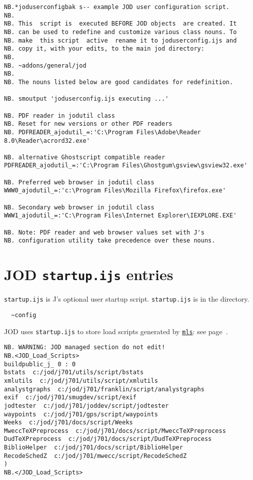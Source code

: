 \begin{lstlisting}[frame=single,framerule=0pt,basicstyle=\ttfamily\footnotesize]  
NB.*joduserconfigbak s-- example JOD user configuration script.
NB.
NB. This  script is  executed BEFORE JOD objects  are created. It
NB. can be used to redefine and customize various class nouns. To
NB. make  this script  active  rename it to joduserconfig.ijs and
NB. copy it, with your edits, to the main jod directory:
NB.
NB. ~addons/general/jod
NB.
NB. The nouns listed below are good candidates for redefinition.

NB. smoutput 'joduserconfig.ijs executing ...'

NB. PDF reader in jodutil class
NB. Reset for new versions or other PDF readers
NB. PDFREADER_ajodutil_=:'C:\Program Files\Adobe\Reader 8.0\Reader\acrord32.exe'

NB. alternative Ghostscript compatible reader
PDFREADER_ajodutil_=:'C:\Program Files\Ghostgum\gsview\gsview32.exe'

NB. Preferred web browser in jodutil class
WWW0_ajodutil_=:'c:\Program Files\Mozilla Firefox\firefox.exe'

NB. Secondary web browser in jodutil class
WWW1_ajodutil_=:'C:\Program Files\Internet Explorer\IEXPLORE.EXE'

NB. Note: PDF reader and web browser values set with J's 
NB. configuration utility take precedence over these nouns. 
\end{lstlisting}

   
   \newpage
   \section{JOD \texttt{startup.ijs} entries}\label{ap:startup}
   
\verb|startup.ijs| is J's optional user startup 
script. \verb|startup.ijs| is in the directory.
\begin{verbatim}
  ~config   
\end{verbatim}
JOD uses \verb|startup.ijs|
to store load scripts generated by \hyperlink{il:mls}{\texttt{mls}}: see page~\pageref{ss:mls}.
   
\begin{lstlisting}[frame=single,framerule=0pt,basicstyle=\ttfamily\footnotesize]   
NB. WARNING: JOD managed section do not edit!
NB.<JOD_Load_Scripts>
buildpublic_j_ 0 : 0
bstats  c:/jod/j701/utils/script/bstats
xmlutils  c:/jod/j701/utils/script/xmlutils
analystgraphs  c:/jod/j701/franklin/script/analystgraphs
exif  c:/jod/j701/smugdev/script/exif
jodtester  c:/jod/j701/joddev/script/jodtester
waypoints  c:/jod/j701/gps/script/waypoints
Weeks  c:/jod/j701/docs/script/Weeks
MweccTeXPreprocess  c:/jod/j701/docs/script/MweccTeXPreprocess
DudTeXPreprocess  c:/jod/j701/docs/script/DudTeXPreprocess
BiblioHelper  c:/jod/j701/docs/script/BiblioHelper
RecodeSchedZ  c:/jod/j701/mwecc/script/RecodeSchedZ
)
NB.</JOD_Load_Scripts>
\end{lstlisting}

